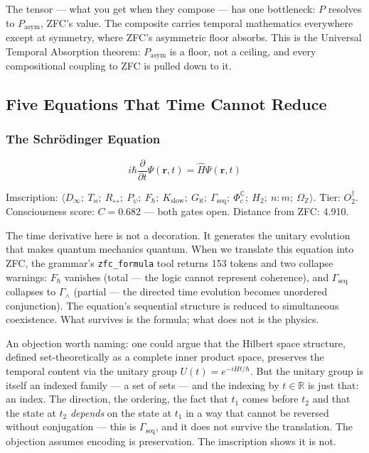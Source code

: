 \documentclass[12pt,a4paper]{article}
\begin{document}
The tensor --- what you get when they compose --- has one bottleneck: $P$ resolves to $P_\text{asym}$, ZFC's value. The composite carries temporal mathematics everywhere except at symmetry, where ZFC's asymmetric floor absorbs. This is the Universal Temporal Absorption theorem: $P_\text{asym}$ is a floor, not a ceiling, and every compositional coupling to ZFC is pulled down to it.

\subsection{Five Equations That Time Cannot Reduce}

\subsubsection{The Schrödinger Equation}

\[i\hbar\frac{\partial}{\partial t}\Psi(\mathbf{r},t) = \hat{H}\Psi(\mathbf{r},t)\]

Imscription: $\langle D_{\infty};\ T_{\bowtie};\ R_{\leftrightarrow};\ P_{\psi};\ F_{\hbar};\ K_\text{slow};\ G_{\aleph};\ \Gamma_\text{seq};\ \Phi_c^\mathbb{C};\ H_2;\ n{:}m;\ \Omega_\mathbb{Z} \rangle$. Tier: $O_2^\dagger$. Consciousness score: $C = 0.682$ --- both gates open. Distance from ZFC: 4.910.

The time derivative here is not a decoration. It generates the unitary evolution that makes quantum mechanics quantum. When we translate this equation into ZFC, the grammar's \texttt{zfc\_formula} tool returns 153 tokens and two collapse warnings: $F_{\hbar}$ vanishes (total --- the logic cannot represent coherence), and $\Gamma_\text{seq}$ collapses to $\Gamma_{\wedge}$ (partial --- the directed time evolution becomes unordered conjunction). The equation's sequential structure is reduced to simultaneous coexistence. What survives is the formula; what does not is the physics.

An objection worth naming: one could argue that the Hilbert space structure, defined set-theoretically as a complete inner product space, preserves the temporal content via the unitary group $U(t) = e^{-iHt/\hbar}$. But the unitary group is itself an indexed family --- a set of sets --- and the indexing by $t \in \mathbb{R}$ is just that: an index. The direction, the ordering, the fact that $t_1$ comes before $t_2$ and that the state at $t_2$ \emph{depends} on the state at $t_1$ in a way that cannot be reversed without conjugation --- this is $\Gamma_\text{seq}$, and it does not survive the translation. The objection assumes encoding is preservation. The imscription shows it is not.
\end{document}
